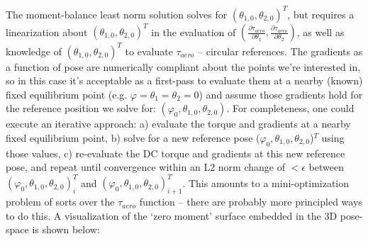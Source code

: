 \documentclass[12pt]{article}
\begin{document}
The moment-balance least norm solution solves for $(\theta_{1, 0}, \theta_{2, 0})^T$, but requires a linearization about $(\theta_{1, 0}, \theta_{2, 0})^T$ in the evaluation of $(\frac{\partial \tau_{aero}}{\partial \theta_1} , \frac{\partial \tau_{aero}}{\partial \theta_2})$, as well as knowledge of $(\theta_{1, 0}, \theta_{2, 0})^T$ to evaluate $\tau_{aero}$ -- circular references.  The gradients as a function of pose are numerically compliant about the points we're interested in, so in this case it's acceptable as a first-pass to evaluate them at a nearby (known) fixed equilibrium point (e.g. $\varphi = \theta_1 = \theta_2 = 0$) and assume those gradients hold for the reference position we solve for: $(\varphi_{0}, \theta_{1, 0}, \theta_{2, 0})$.  For completeness, one could execute an iterative approach: a) evaluate the torque and gradients at a nearby fixed equilibrium point, b) solve for a new reference pose ($\varphi_{0}, \theta_{1, 0}, \theta_{2, 0}$)$^T$ using those values, c) re-evaluate the DC torque and gradients at this new reference pose, and repeat until convergence within an L2 norm change of $<\epsilon$ between $(\varphi_{0}, \theta_{1, 0}, \theta_{2, 0})_{i}^T$ and $(\varphi_{0}, \theta_{1, 0}, \theta_{2, 0})_{i+1}^T$.  This amounts to a mini-optimization problem of sorts over the $\tau_{aero}$ function -- there are probably more principled ways to do this.  A visualization of the `zero moment' surface embedded in the 3D pose-space is shown below:
\clearpage
\end{document}

